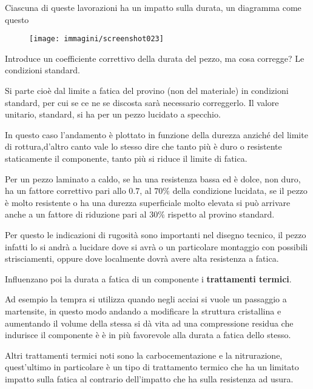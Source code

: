 \documentclass{article}
\begin{document}
\begin{adjustwidth}{2in}{}
			 Ciascuna di queste lavorazioni ha un impatto sulla durata, un diagramma come questo
			 
			 \begin{figure}[H]
			 	\centering
			 	\texttt{[image: immagini/screenshot023]}
			 	\label{fig:screenshot023}
			 \end{figure}
			 
			Introduce un coefficiente correttivo della durata del pezzo, ma cosa corregge? Le condizioni standard.
			
		    Si parte cioè dal limite a fatica del provino (non del materiale) in condizioni standard, per cui se ce ne se discosta sarà necessario correggerlo.  
		    Il valore unitario, standard, si ha per un pezzo lucidato a specchio.
		    
		    In questo caso l'andamento è plottato in funzione della durezza anziché del limite di rottura,d'altro canto vale lo stesso dire che tanto più è duro o resistente staticamente il componente, tanto più si riduce il limite di fatica. 
		    
		    Per un pezzo laminato a caldo, se ha una resistenza bassa ed è dolce, non duro, ha un fattore correttivo pari allo $0.7$, al $ 70\% $ della condizione lucidata, se il pezzo è molto resistente o ha una durezza superficiale molto elevata si può arrivare anche a un fattore di riduzione pari al $ 30\% $ rispetto al provino standard. 
		    
		    Per questo le indicazioni di rugosità sono importanti nel disegno tecnico, il pezzo infatti lo si andrà a lucidare dove si avrà o un particolare montaggio con possibili strisciamenti, oppure dove localmente dovrà avere alta resistenza a fatica. \newline
			 
			Influenzano poi la durata a fatica di un componente i \textbf{trattamenti termici}. 
			
			Ad esempio la tempra si utilizza quando negli acciai si vuole un passaggio a martensite, in questo modo andando a modificare la struttura cristallina e aumentando il volume della stessa si dà vita ad una compressione residua che indurisce il componente è è in più favorevole alla durata a fatica dello stesso. 
			
			Altri trattamenti termici noti sono la carbocementazione e la nitrurazione, quest'ultimo in particolare è un tipo di trattamento termico che ha un limitato impatto sulla fatica al contrario dell'impatto che ha sulla resistenza ad usura. \newline 
			

\end{adjustwidth}
\end{document}
